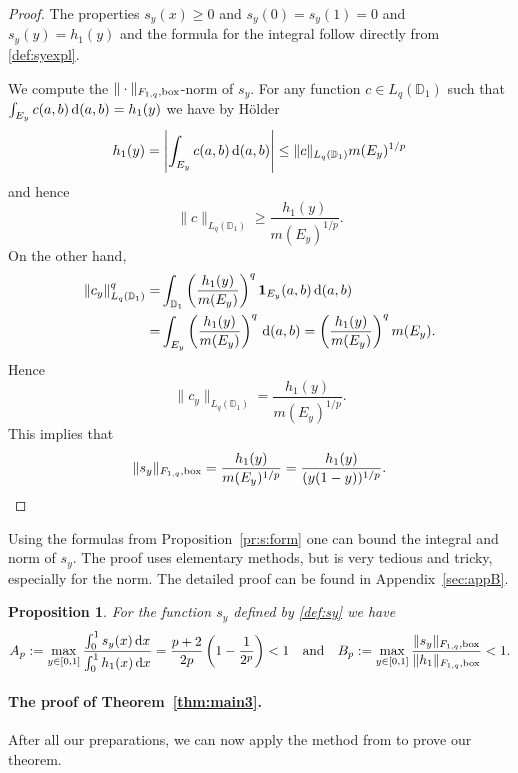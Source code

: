 \documentclass[12pt]{article}
\newtheorem{prop}[thm]{Proposition}
\theoremstyle{remark}
\theoremstyle{definition}
\newcommand{\D}{\mathbb{D}}
\newcommand{\bx}{{\rm box}}
\newcommand{\rd}{\,{\rm d}}
\newcommand{\<}{\langle}
\renewcommand{\>}{\rangle}
\begin{document}
\begin{proof}
The properties $s_y(x) \ge 0$ and $s_y(0)=s_y(1)=0$ and $s_y(y)=h_1(y)$ and the formula for the integral follow directly from \eqref{def:syexpl}.

We compute the $\|\cdot\|_{F_{1,q},\bx}$-norm of $s_y$. For any function $c \in L_q(\D_1)$ such that $\int_{E_y} c(a,b) \rd (a,b)=h_1(y)$ we have by H\"older 
\begin{equation}\label{Hoehd}
h_1(y)=\left|\int_{E_y} c(a,b) \rd (a,b)\right| \le \|c\|_{L_q(\D_1)} m(E_y)^{1/p}
\end{equation}
and hence 
\begin{equation*}
\|c\|_{L_q(\D_1)} \ge \frac{h_1(y)}{m(E_y)^{1/p}}.
\end{equation*}
On the other hand, 
\begin{align*}
\|c_y\|_{L_q(\D_1)}^q = & \int_{\D_1} \left(\frac{h_1(y)}{m(E_y)}\right)^q {\bf 1}_{E_y}(a,b) \rd(a,b)\\
= & \int_{E_y} \left(\frac{h_1(y)}{m(E_y)}\right)^q \rd(a,b) = \left(\frac{h_1(y)}{m(E_y)}\right)^q m(E_y).
\end{align*}
Hence $$\|c_y\|_{L_q(\D_1)}=\frac{h_1(y)}{m(E_y)^{1/p}}.$$ This implies that $$\|s_y\|_{F_{1,q},\bx}=\frac{h_1(y)}{m(E_y)^{1/p}}=\frac{h_1(y)}{(y(1-y))^{1/p}}.$$
\end{proof}

Using the formulas from Proposition~\ref{pr:s:form} one can bound the integral and norm of $s_y$. The proof uses elementary methods, but is very tedious and tricky, especially for the norm. The detailed proof can be found in Appendix~\ref{sec:appB}.

\begin{prop}\label{pr:big1}
For the function $s_y$ defined by \eqref{def:sy} we have $$A_p:=\max_{y \in [0,1]} \frac{\int_0^1 s_y(x)\rd x}{\int_0^1 h_1(x)\rd x}=\frac{p+2}{2 p} \left(1-\frac{1}{2^p}\right) < 1 \quad \mbox{and}\quad B_p:=\max_{y \in [0,1]} \frac{\|s_y\|_{F_{1,q},\bx}}{\|h_1\|_{F_{1,q},\bx}} < 1.$$
\end{prop}



\paragraph{The proof of Theorem~\ref{thm:main3}.} After all our preparations, we can now apply the method from \cite{NP25} to prove our theorem.
\end{document}
